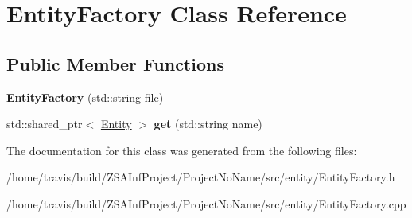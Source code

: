 \hypertarget{classEntityFactory}{\section{Entity\-Factory Class Reference}
\label{classEntityFactory}
}
\subsection*{Public Member Functions}
\begin{DoxyCompactItemize}
\item 
\hypertarget{classEntityFactory_a69576e4b61858825b5892f05575fb423}{{\bfseries Entity\-Factory} (std\-::string file)}\label{classEntityFactory_a69576e4b61858825b5892f05575fb423}

\item 
\hypertarget{classEntityFactory_ade262eed788648b710e64d332449a759}{std\-::shared\-\_\-ptr$<$ \hyperlink{classEntity}{Entity} $>$ {\bfseries get} (std\-::string name)}\label{classEntityFactory_ade262eed788648b710e64d332449a759}

\end{DoxyCompactItemize}


The documentation for this class was generated from the following files\-:\begin{DoxyCompactItemize}
\item 
/home/travis/build/\-Z\-S\-A\-Inf\-Project/\-Project\-No\-Name/src/entity/Entity\-Factory.\-h\item 
/home/travis/build/\-Z\-S\-A\-Inf\-Project/\-Project\-No\-Name/src/entity/Entity\-Factory.\-cpp\end{DoxyCompactItemize}
